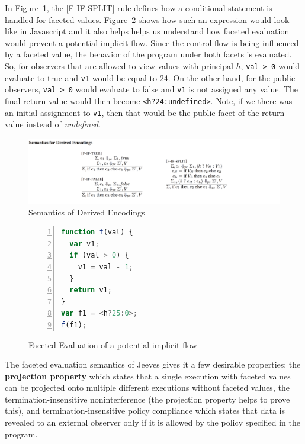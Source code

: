 In Figure~\ref{fig:fif}, the [F-IF-SPLIT] rule defines how a conditional statement
is handled for faceted values. Figure~\ref{fig:implicit flow} shows how such an
expression would look like in Javascript and it also helps helps us understand
how faceted evaluation would prevent a potential implicit flow. Since the control
flow is being influenced by a faceted value, the behavior of the program under both
facets is evaluated. So, for observers that are allowed to view values with principal
$h$, \texttt{val > 0} would evaluate to true and \texttt{v1} would be equal to 24.
On the other hand, for the public observers, \texttt{val > 0} would evaluate to
false and \texttt{v1} is not assigned any value. The final return value would then
become \texttt{<h?24:undefined>}. Note, if we there was an initial assignment to
\texttt{v1}, then that would be the public facet of the return value instead of
\textit{undefined}.

\begin{figure}
	\centering
	\includegraphics[scale=0.275, frame]{images/fif.png}
	\caption{Semantics of Derived Encodings~\cite{FacetedJeeves}}
	\label{fig:fif}
\end{figure}

\begin{figure}
	\begin{lstlisting}[language=javascript,frame=single, breaklines=true,basicstyle=\footnotesize\ttfamily, numbers=left, extendedchars=true, tabsize=2]
function f(val) {
  var v1;
  if (val > 0) {
    v1 = val - 1;
  }
  return v1;
}
var f1 = <h?25:0>;
f(f1);
\end{lstlisting}
\caption{Faceted Evaluation of a potential implicit flow}
\label{fig:implicit flow}
\end{figure}

The faceted evaluation semantics of Jeeves gives it a few desirable properties;
the \textbf{projection property} which states that a single execution with faceted
values can be projected onto multiple different executions without faceted values,
the termination-insensitive noninterference (the projection property helps to prove
this), and termination-insensitive policy compliance which states that data is revealed
to an external observer only if it is allowed by the policy specified in the program.


